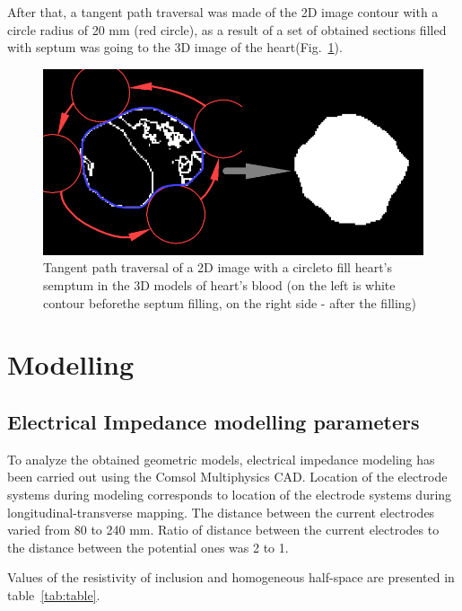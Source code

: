 \documentclass[conference]{IEEEtran}
\begin{document}
After that, a tangent path traversal was made of the 2D image contour with a circle radius of 20 mm (red circle), as a result of a set of obtained sections filled with septum was going to the 3D image of the heart(Fig.~\ref{fig:algo2}).

\begin{figure}[tbph]
    \centering
    \includegraphics[width=0.9\linewidth]{fig/algo2}
    \caption{Tangent path traversal of a 2D image with a circleto fill heart's semptum
    in the 3D models of heart's blood (on the left is white contour beforethe septum filling,
        on the right side - after the filling)}
    \label{fig:algo2}
\end{figure}

\section{Modelling}
\subsection{Electrical Impedance modelling parameters}

To analyze the obtained geometric models, electrical impedance modeling has been carried out using the Comsol Multiphysics CAD.
Location of the electrode systems during modeling corresponds to location of the electrode systems during longitudinal-transverse mapping.
The distance between the current electrodes varied from 80 to 240 mm.
Ratio of distance between the current electrodes to the distance between the potential ones was 2 to 1.

Values of the resistivity of inclusion and homogeneous half-space are presented in table~\ref{tab:table}.
\end{document}
